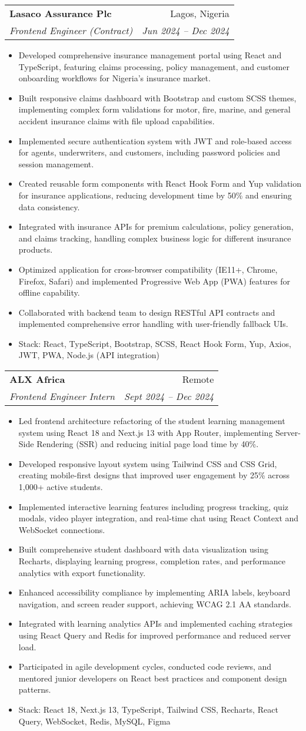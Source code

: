 \documentclass[letterpaper,11pt]{article}
\makeatletter
\newcommand{\resumeItem}[1]{
  \item\small{
    {#1 \vspace{-2pt}}
  }
}
\newcommand{\resumeSubheading}[4]{
  \vspace{-1pt}\item
    \begin{tabular*}{0.97\textwidth}{l@{\extracolsep{\fill}}r}
      \textbf{#1} & #2 \\
      \textit{\small#3} & \textit{\small #4} \\
    \end{tabular*}\vspace{-5pt}
}
\newcommand{\resumeItemListStart}{\begin{itemize}}
\newcommand{\resumeItemListEnd}{\end{itemize}\vspace{-5pt}}
\makeatother
\begin{document}
    \resumeSubheading
    {Lasaco Assurance Plc}{Lagos, Nigeria}
    {Frontend Engineer (Contract)}{Jun 2024 – Dec 2024}
    \resumeItemListStart
      \resumeItem{Developed comprehensive insurance management portal using React and TypeScript, featuring claims processing, policy management, and customer onboarding workflows for Nigeria's insurance market.}
      \resumeItem{Built responsive claims dashboard with Bootstrap and custom SCSS themes, implementing complex form validations for motor, fire, marine, and general accident insurance claims with file upload capabilities.}
      \resumeItem{Implemented secure authentication system with JWT and role-based access for agents, underwriters, and customers, including password policies and session management.}
      \resumeItem{Created reusable form components with React Hook Form and Yup validation for insurance applications, reducing development time by 50\% and ensuring data consistency.}
      \resumeItem{Integrated with insurance APIs for premium calculations, policy generation, and claims tracking, handling complex business logic for different insurance products.}
      \resumeItem{Optimized application for cross-browser compatibility (IE11+, Chrome, Firefox, Safari) and implemented Progressive Web App (PWA) features for offline capability.}
      \resumeItem{Collaborated with backend team to design RESTful API contracts and implemented comprehensive error handling with user-friendly fallback UIs.}
      \resumeItem{Stack: React, TypeScript, Bootstrap, SCSS, React Hook Form, Yup, Axios, JWT, PWA, Node.js (API integration)}
    \resumeItemListEnd

    \resumeSubheading
    {ALX Africa}{Remote}
    {Frontend Engineer Intern}{Sept 2024 – Dec 2024}
    \resumeItemListStart
      \resumeItem{Led frontend architecture refactoring of the student learning management system using React 18 and Next.js 13 with App Router, implementing Server-Side Rendering (SSR) and reducing initial page load time by 40\%.}
      \resumeItem{Developed responsive layout system using Tailwind CSS and CSS Grid, creating mobile-first designs that improved user engagement by 25\% across 1,000+ active students.}
      \resumeItem{Implemented interactive learning features including progress tracking, quiz modals, video player integration, and real-time chat using React Context and WebSocket connections.}
      \resumeItem{Built comprehensive student dashboard with data visualization using Recharts, displaying learning progress, completion rates, and performance analytics with export functionality.}
      \resumeItem{Enhanced accessibility compliance by implementing ARIA labels, keyboard navigation, and screen reader support, achieving WCAG 2.1 AA standards.}
      \resumeItem{Integrated with learning analytics APIs and implemented caching strategies using React Query and Redis for improved performance and reduced server load.}
      \resumeItem{Participated in agile development cycles, conducted code reviews, and mentored junior developers on React best practices and component design patterns.}
      \resumeItem{Stack: React 18, Next.js 13, TypeScript, Tailwind CSS, Recharts, React Query, WebSocket, Redis, MySQL, Figma}
    \resumeItemListEnd
\end{document}
